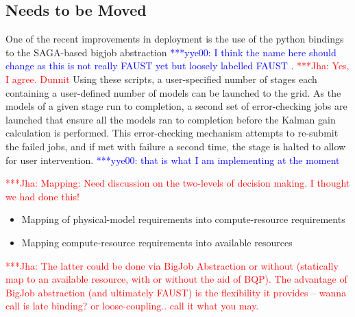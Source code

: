 \documentclass[conference,final]{IEEEtran}
\newcommand{\jhanote}[1]{ {\textcolor{red} { ***Jha: #1 }}}
\newcommand{\yyenote}[1]{ {\textcolor{blue} { ***yye00: #1 }}}
\begin{document}
\subsection{Needs to be Moved}
One of the recent improvements in deployment is the use of the python
bindings to the SAGA-based bigjob abstraction \yyenote{I think the
  name here should change as this is not really FAUST yet but loosely
  labelled FAUST}. \jhanote{Yes, I agree. Dunnit} 
Using these scripts, a user-specified number of stages each containing
a user-defined number of models can be launched to the grid. As the
models of a given stage run to completion, a second set of
error-checking jobs are launched that ensure all the models ran to
completion before the Kalman gain calculation is performed. This
error-checking mechanism attempts to re-submit the failed jobs, and if
met with failure a second time, the stage is halted to allow for user
intervention. \yyenote{that is what I am implementing at the moment}

\jhanote{Mapping: Need discussion on the two-levels of decision
  making. I thought we had done this!}

\begin{itemize}
\item Mapping of physical-model requirements into compute-resource requirements
\item Mapping compute-resource requirements into available resources
\end{itemize}
\jhanote{The latter could be done via BigJob Abstraction or without
  (statically map to an available resource, with or without the aid of
  BQP).  The advantage of BigJob abstraction (and ultimately FAUST) is
  the flexibility it provides -- wanna call is late binding? or
  loose-coupling..  call it what you may.}
\end{document}
